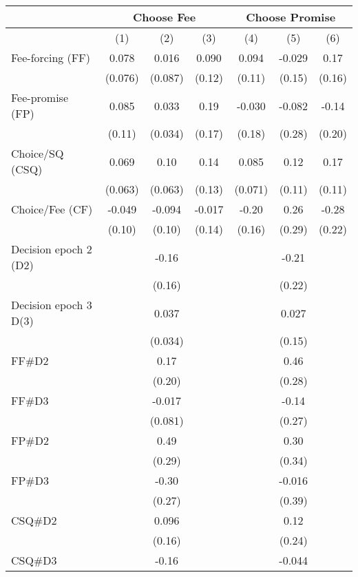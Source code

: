 \begin{tabular}{lccc|ccc}
\toprule
      & \multicolumn{3}{c|}{Choose Fee} & \multicolumn{3}{c}{Choose Promise} \\
\midrule
      & (1)   & (2)   & (3)   & (4)   & (5)   & (6) \\
\midrule
\midrule
Fee-forcing (FF) & 0.078 & 0.016 & 0.090 & 0.094 & -0.029 & 0.17 \\
      & (0.076) & (0.087) & (0.12) & (0.11) & (0.15) & (0.16) \\
Fee-promise (FP) & 0.085 & 0.033 & 0.19  & -0.030 & -0.082 & -0.14 \\
      & (0.11) & (0.034) & (0.17) & (0.18) & (0.28) & (0.20) \\
Choice/SQ (CSQ) & 0.069 & 0.10  & 0.14  & 0.085 & 0.12  & 0.17 \\
      & (0.063) & (0.063) & (0.13) & (0.071) & (0.11) & (0.11) \\
Choice/Fee (CF) & -0.049 & -0.094 & -0.017 & -0.20 & 0.26  & -0.28 \\
      & (0.10) & (0.10) & (0.14) & (0.16) & (0.29) & (0.22) \\
Decision epoch 2 (D2) &       & -0.16 &       &       & -0.21 &  \\
      &       & (0.16) &       &       & (0.22) &  \\
Decision epoch 3 D(3) &       & 0.037 &       &       & 0.027 &  \\
      &       & (0.034) &       &       & (0.15) &  \\
FF\#D2 &       & 0.17  &       &       & 0.46  &  \\
      &       & (0.20) &       &       & (0.28) &  \\
FF\#D3 &       & -0.017 &       &       & -0.14 &  \\
      &       & (0.081) &       &       & (0.27) &  \\
FP\#D2 &       & 0.49  &       &       & 0.30  &  \\
      &       & (0.29) &       &       & (0.34) &  \\
FP\#D3 &       & -0.30 &       &       & -0.016 &  \\
      &       & (0.27) &       &       & (0.39) &  \\
CSQ\#D2 &       & 0.096 &       &       & 0.12  &  \\
      &       & (0.16) &       &       & (0.24) &  \\
CSQ\#D3 &       & -0.16 &       &       & -0.044 &  \\

\end{tabular}
